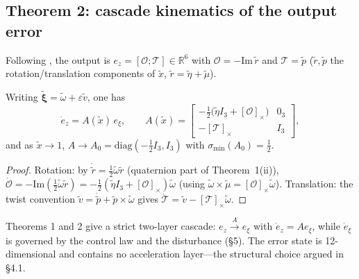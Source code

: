 \subsection{Theorem 2: cascade kinematics of the output error}

Following \cite{P2}, the output is $e_z=[\mathcal O;\mathcal T]\in\mathbb R^6$ with $\mathcal O=-\mathrm{Im}\,\tilde r$ and $\mathcal T=\tilde p$ ($\tilde r,\tilde p$ the rotation/translation components of $\tilde x$, $\tilde r=\tilde\eta+\tilde\mu$).

\begin{theorem}\label{thm:2}
Writing $\tilde{\boldsymbol\xi}=\tilde\omega+\varepsilon\tilde v$, one has
\begin{equation}
\dot e_z=A(\tilde x)\,e_\xi,
\qquad
A(\tilde x)=
\begin{bmatrix}
-\tfrac12\bigl(\tilde\eta I_3+[\mathcal O]_\times\bigr) & 0_3\\[2pt]
-[\mathcal T]_\times & I_3
\end{bmatrix},
\tag{4.5}\label{eq:4.5}
\end{equation}
and as $\tilde x\to1$, $A\to A_0=\mathrm{diag}(-\tfrac12I_3,I_3)$ with $\sigma_{\min}(A_0)=\tfrac12$.
\end{theorem}

\begin{proof}
Rotation: by $\dot{\tilde r}=\tfrac12\tilde\omega\tilde r$ (quaternion part of Theorem~1(ii)),
$\dot{\mathcal O}=-\mathrm{Im}(\tfrac12\tilde\omega\tilde r)=-\tfrac12(\tilde\eta I_3+[\mathcal O]_\times)\tilde\omega$ (using $\tilde\omega\times\tilde\mu=[\mathcal O]_\times\tilde\omega$). Translation: the twist convention $\tilde v=\dot{\tilde p}+\tilde p\times\tilde\omega$ gives $\dot{\mathcal T}=\tilde v-[\mathcal T]_\times\tilde\omega$.
\end{proof}

Theorems 1 and 2 give a strict two-layer cascade: $e_z\xrightarrow{A}e_\xi$ with $\dot e_z=Ae_\xi$, while $\dot e_\xi$ is governed by the control law and the disturbance (\S5). The error state is 12-dimensional and contains no acceleration layer---the structural choice argued in \S4.1.
